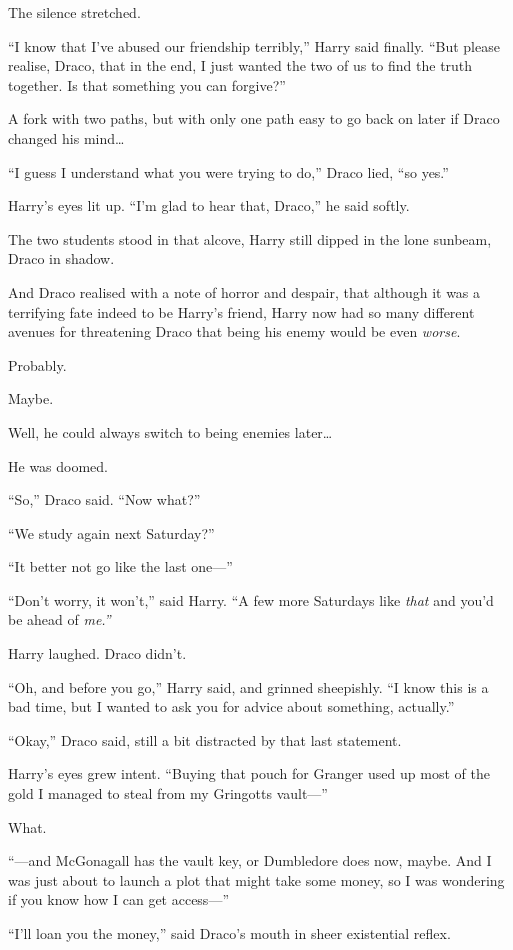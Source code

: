 The silence stretched.

``I know that I've abused our friendship terribly,'' Harry said finally.
``But please realise, Draco, that in the end, I just wanted the two of
us to find the truth together. Is that something you can forgive?''

A fork with two paths, but with only one path easy to go back on later
if Draco changed his mind\ldots{}

``I guess I understand what you were trying to do,'' Draco lied, ``so
yes.''

Harry's eyes lit up. ``I'm glad to hear that, Draco,'' he said softly.

The two students stood in that alcove, Harry still dipped in the lone
sunbeam, Draco in shadow.

And Draco realised with a note of horror and despair, that although it
was a terrifying fate indeed to be Harry's friend, Harry now had so many
different avenues for threatening Draco that being his enemy would be
even \emph{worse}.

Probably.

Maybe.

Well, he could always switch to being enemies later\ldots{}

He was doomed.

``So,'' Draco said. ``Now what?''

``We study again next Saturday?''

``It better not go like the last one---''

``Don't worry, it won't,'' said Harry. ``A few more Saturdays like
\emph{that} and you'd be ahead of \emph{me.''}

Harry laughed. Draco didn't.

``Oh, and before you go,'' Harry said, and grinned sheepishly. ``I know
this is a bad time, but I wanted to ask you for advice about something,
actually.''

``Okay,'' Draco said, still a bit distracted by that last statement.

Harry's eyes grew intent. ``Buying that pouch for Granger used up most
of the gold I managed to steal from my Gringotts vault---''

What.

``---and McGonagall has the vault key, or Dumbledore does now, maybe.
And I was just about to launch a plot that might take some money, so I
was wondering if you know how I can get access---''

``I'll loan you the money,'' said Draco's mouth in sheer existential
reflex.

